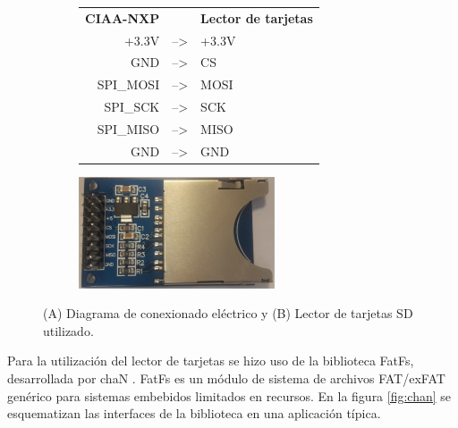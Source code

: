 \vspace{20px}

\begin{figure}[h]
	\centering
	\begin{subfigure}{.4\textwidth}
		\centering
		\begin{tabular}{rll}
			\textbf{CIAA-NXP }&	& \textbf{Lector de tarjetas}\\
			+3.3V     & --\textgreater{} & +3.3V   \\
			GND       & --\textgreater{} & CS  \\
			SPI\_MOSI & --\textgreater{} & MOSI  \\
			SPI\_SCK  & --\textgreater{} & SCK \\
			SPI\_MISO & --\textgreater{} & MISO  \\
			GND       & --\textgreater{} & GND  \\
		\end{tabular}
		\caption{ }
  		\label{fig:lector_conexionado}
	\end{subfigure}%
	\begin{subfigure}{.6\textwidth}
	\hspace{15px}
		\centering
		\includegraphics[height=3.3cm]{./Figures/sdCardReader.jpg}
		\caption{ }
		\label{fig:lector_hardware}
	\end{subfigure}
	\caption{(A) Diagrama de conexionado eléctrico y (B) Lector de tarjetas SD utilizado.}
	\label{fig:lector_sdCard}
\end{figure}

\vspace{10px}

Para la utilización del lector de tarjetas se hizo uso de la biblioteca FatFs, desarrollada por chaN \citep{fatFS}. FatFs es un módulo de sistema de archivos FAT/exFAT genérico para sistemas embebidos limitados en recursos. En la figura \ref{fig:chan} se esquematizan las interfaces de la biblioteca en una aplicación típica. 

